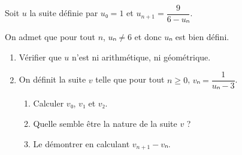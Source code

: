 \documentclass[
	classe=$1^{ere}STI2D$
]{exercice}
\begin{document}
\begin{exercice}
	Soit $u$ la suite définie par $u₀ = 1$ et $u_{n+1} = \dfrac{9}{6 - uₙ}$.

	On admet que pour tout $n$, $uₙ ≠ 6$ et donc $uₙ$ est bien défini.
	\begin{enumerate}
		\item Vérifier que $u$ n'est ni arithmétique, ni géométrique.

		\item On définit la suite $v$ telle que pour tout $n ≥ 0$, $vₙ = \dfrac{1}{uₙ - 3}$.
		      \begin{enumerate}
			      \item Calculer $v₀$, $v₁$ et $v₂$.

			      \item Quelle semble être la nature de la suite $v$ ?


			      \item Le démontrer en calculant $v_{n+1} - vₙ$.


\end{enumerate}
\end{enumerate}
\end{exercice}
\end{document}
